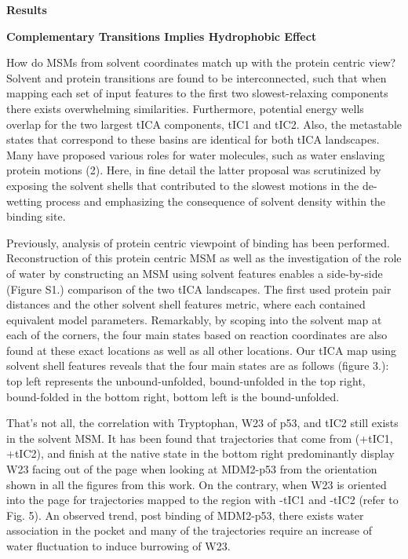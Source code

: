 
\textbf{Results}

\textbf{Complementary Transitions Implies Hydrophobic Effect}

How do MSMs from solvent coordinates match up with the protein centric
view? Solvent and protein transitions are found to be interconnected,
such that when mapping each set of input features to the first two
slowest-relaxing components there exists overwhelming similarities.
Furthermore, potential energy wells overlap for the two largest tICA
components, tIC1 and tIC2. Also, the metastable states that correspond
to these basins are identical for both tICA landscapes. Many have
proposed various roles for water molecules, such as water enslaving
protein motions (2). Here, in fine detail the latter proposal was
scrutinized by exposing the solvent shells that contributed to the
slowest motions in the de-wetting process and emphasizing the
consequence of solvent density within the binding site.

Previously, analysis of protein centric viewpoint of binding has been
performed. Reconstruction of this protein centric MSM as well as the
investigation of the role of water by constructing an MSM using solvent
features enables a side-by-side (Figure S1.) comparison of the two tICA
landscapes. The first used protein pair distances and the other solvent
shell features metric, where each contained equivalent model parameters.
Remarkably, by scoping into the solvent map at each of the corners, the
four main states based on reaction coordinates are also found at these
exact locations as well as all other locations. Our tICA map using
solvent shell features reveals that the four main states are as follows
(figure 3.): top left represents the unbound-unfolded, bound-unfolded in
the top right, bound-folded in the bottom right, bottom left is the
bound-unfolded.

That's not all, the correlation with Tryptophan, W23 of p53, and tIC2
still exists in the solvent MSM. It has been found that trajectories
that come from (+tIC1, +tIC2), and finish at the native state in the
bottom right predominantly display W23 facing out of the page when
looking at MDM2-p53 from the orientation shown in all the figures from
this work. On the contrary, when W23 is oriented into the page for
trajectories mapped to the region with -tIC1 and -tIC2 (refer to Fig.
5). An observed trend, post binding of MDM2-p53, there exists water
association in the pocket and many of the trajectories require an
increase of water fluctuation to induce burrowing of W23.

